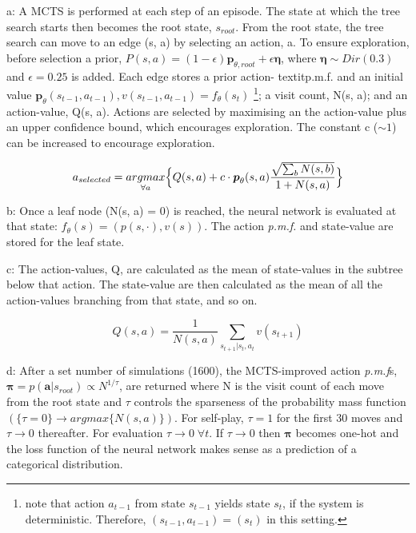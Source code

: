 \documentclass[../main.tex]{subfiles}
\begin{document}
a:
A MCTS is performed at each step of an episode. The state at which the tree search starts then becomes the root state, $s_{root}$. From the root state, the tree search can move to an edge (s, a) by selecting an action, a. To ensure exploration, before selection a prior, $P(s, a) = (1-\epsilon)\boldsymbol{p}_{\theta, root} + \epsilon \boldsymbol{\eta}$, where $\boldsymbol{\eta} \sim Dir(0.3)$ and $\epsilon = 0.25$ is added. Each edge stores a prior action- textit{p.m.f.} and an initial value $\boldsymbol{p}_\theta (s_{t-1}, a_{t-1}), v(s_{t-1}, a_{t-1}) =f_\theta(s_t)$ \footnote{note that action $a_{t-1}$ from state $s_{t-1}$ yields state $s_t$, if the system is deterministic. Therefore, $(s_{t-1}, a_{t-1}) = (s_t)$ in this setting.}; a visit count, N(s, a); and an action-value, Q(s, a). Actions are selected by maximising an the action-value plus an upper confidence bound, which encourages exploration. The constant c ($\sim 1$) can be increased to encourage exploration.

\begin{equation}
   a_{selected} = \underset{\forall a}{argmax} \Big{\{}Q(s, a) + c \cdot\boldsymbol{p}_\theta (s, a)\frac{\sqrt{\sum_b N(s, b)}}{1 + N(s, a)}\Big{\}}
   \label{eqn:ucb}
\end{equation}

b:
Once a leaf node (N(s, a) = 0) is reached, the neural network is evaluated at that state: $f_\theta (s) = (p(s, \cdot), v(s))$. The action \textit{p.m.f.} and state-value are stored for the leaf state.

c:
The action-values, Q, are calculated as the mean of state-values in the subtree below that action. The state-value are then calculated as the mean of all the action-values branching from that state, and so on.

\begin{equation}
   Q(s, a) = \frac{1}{N(s, a)} \sum_{s_{t+1} | s_t, a_t} v(s_{t+1})
   \label{eqn:actionvalue}
\end{equation} 

d:
After a set number of simulations (1600), the MCTS-improved action \textit{p.m.f}s, $\boldsymbol{\pi} = p(\boldsymbol{a} | s_{root}) \propto N^{1/\tau}$, are returned where N is the visit count of each move from the root state and $\tau$ controls the sparseness of the probability mass function $(\{\tau = 0\} \rightarrow argmax\{N(s, a)\})$. For self-play, $\tau = 1$ for the first 30 moves and $\tau \rightarrow 0$ thereafter. For evaluation $\tau \rightarrow 0 \; \forall t$. If $\tau \rightarrow 0$ then $\boldsymbol{\pi}$ becomes one-hot and the loss function of the neural network makes sense as a prediction of a categorical distribution.
\end{document}
